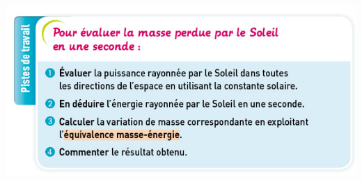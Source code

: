 \documentclass[10pt]{article}
\begin{document}
\begin{center}
	\includegraphics[scale=0.45]{assets/q.png}
\end{center}
\end{document}
